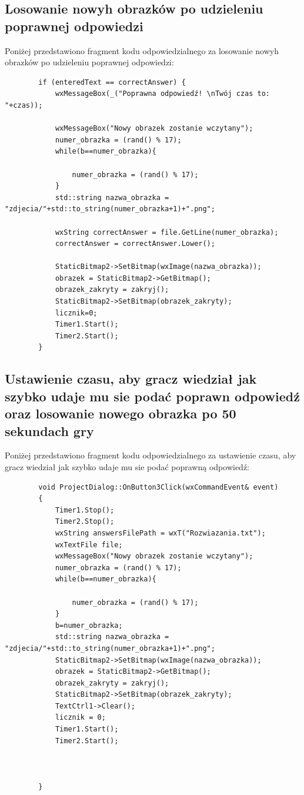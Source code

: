 \documentclass{article}
\begin{document}
	\subsection{Losowanie nowyh obrazków po udzieleniu poprawnej odpowiedzi}
	Poniżej przedstawiono fragment kodu odpowiedzialnego za losowanie nowyh obrazków po udzieleniu poprawnej odpowiedzi:
	\begin{lstlisting}
		if (enteredText == correctAnswer) {
			wxMessageBox(_("Poprawna odpowiedź! \nTwój czas to: "+czas));
			
			wxMessageBox("Nowy obrazek zostanie wczytany");
			numer_obrazka = (rand() % 17);
			while(b==numer_obrazka){
				
				numer_obrazka = (rand() % 17);
			}
			std::string nazwa_obrazka = "zdjecia/"+std::to_string(numer_obrazka+1)+".png";
			
			wxString correctAnswer = file.GetLine(numer_obrazka);
			correctAnswer = correctAnswer.Lower();
			
			StaticBitmap2->SetBitmap(wxImage(nazwa_obrazka));
			obrazek = StaticBitmap2->GetBitmap();
			obrazek_zakryty = zakryj();
			StaticBitmap2->SetBitmap(obrazek_zakryty);
			licznik=0;
			Timer1.Start();
			Timer2.Start();
		}
	\end{lstlisting}
	
	\subsection{Ustawienie czasu, aby gracz wiedział jak szybko udaje mu sie podać poprawn odpowiedź oraz losowanie nowego obrazka po 50 sekundach gry}
	Poniżej przedstawiono fragment kodu odpowiedzialnego za ustawienie czasu, aby gracz wiedział jak szybko udaje mu sie podać poprawną odpowiedź:
	\begin{lstlisting}
		void ProjectDialog::OnButton3Click(wxCommandEvent& event)
		{
			Timer1.Stop();
			Timer2.Stop();
			wxString answersFilePath = wxT("Rozwiazania.txt");
			wxTextFile file;
			wxMessageBox("Nowy obrazek zostanie wczytany");
			numer_obrazka = (rand() % 17);
			while(b==numer_obrazka){
				
				numer_obrazka = (rand() % 17);
			}
			b=numer_obrazka;
			std::string nazwa_obrazka = "zdjecia/"+std::to_string(numer_obrazka+1)+".png";
			StaticBitmap2->SetBitmap(wxImage(nazwa_obrazka));
			obrazek = StaticBitmap2->GetBitmap();
			obrazek_zakryty = zakryj();
			StaticBitmap2->SetBitmap(obrazek_zakryty);
			TextCtrl1->Clear();
			licznik = 0;
			Timer1.Start();
			Timer2.Start();
			
			
			
		}
	\end{lstlisting}
	
\end{document}
